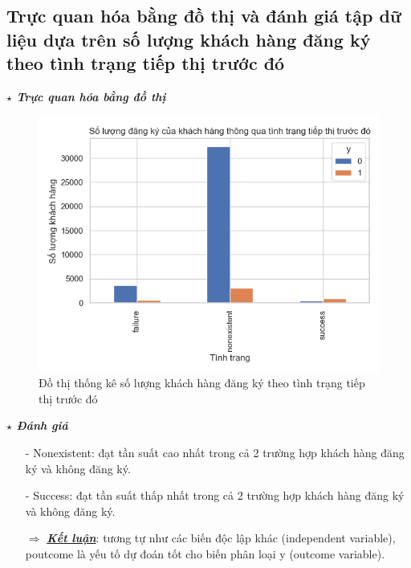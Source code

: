\documentclass{report}
\begin{document}
        \pagebreak
        
        \subsection{Trực quan hóa bằng đồ thị và đánh giá tập dữ liệu dựa trên số lượng khách hàng đăng ký theo tình trạng tiếp thị trước đó}
            \fontsize{13}{10}\selectfont \textbf{$\star$\textit{ Trực quan hóa bằng đồ thị}}
                \begin{figure}[htp]
                    \centering
                    \includegraphics[scale = 0.8]{image/frequency_poutcome.png}
                    \caption{Đồ thị thống kê  số lượng khách hàng đăng ký theo tình trạng tiếp thị trước đó}
                \end{figure}
            
            \fontsize{13}{10}\selectfont \textbf{$\star$\textit{ Đánh giá}}
                \begin{enumerate}
                    \item [- ] Nonexistent: đạt tần suất cao nhất trong cả 2 trường hợp khách hàng đăng ký và không đăng ký.
                    \item [- ] Success: đạt tần suất thấp nhất trong cả 2 trường hợp khách hàng đăng ký và không đăng ký.
                    \item [$\Rightarrow$] \textbf{\underline{\textit{Kết luận}}}: tương tự như các biến độc lập khác (independent variable), poutcome là yếu tố dự đoán tốt cho biến phân loại y (outcome variable).
                \end{enumerate}
            
\end{document}
